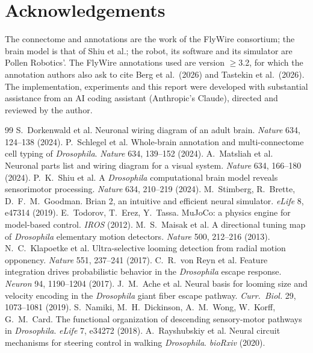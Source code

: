 \documentclass[10pt,a4paper]{article}
\begin{document}
\section*{Acknowledgements}

The connectome and annotations are the work of the FlyWire consortium; the brain model is that of Shiu et
al.; the robot, its software and its simulator are Pollen Robotics'. The FlyWire annotations used are
version $\geq$3.2, for which the annotation authors also ask to cite Berg et al.\ (2026) and Tastekin et
al.\ (2026). The implementation, experiments and this report were developed with substantial assistance
from an AI coding assistant (Anthropic's Claude), directed and reviewed by the author.

\begin{thebibliography}{99}\small
{} S.~Dorkenwald et al. Neuronal wiring diagram of an adult brain. \emph{Nature} 634, 124--138 (2024).
 P.~Schlegel et al. Whole-brain annotation and multi-connectome cell typing of \emph{Drosophila}. \emph{Nature} 634, 139--152 (2024).
 A.~Matsliah et al. Neuronal parts list and wiring diagram for a visual system. \emph{Nature} 634, 166--180 (2024).
 P.~K.~Shiu et al. A \emph{Drosophila} computational brain model reveals sensorimotor processing. \emph{Nature} 634, 210--219 (2024).
 M.~Stimberg, R.~Brette, D.~F.~M.~Goodman. Brian 2, an intuitive and efficient neural simulator. \emph{eLife} 8, e47314 (2019).
 E.~Todorov, T.~Erez, Y.~Tassa. MuJoCo: a physics engine for model-based control. \emph{IROS} (2012).
 M.~S.~Maisak et al. A directional tuning map of \emph{Drosophila} elementary motion detectors. \emph{Nature} 500, 212--216 (2013).
 N.~C.~Klapoetke et al. Ultra-selective looming detection from radial motion opponency. \emph{Nature} 551, 237--241 (2017).
 C.~R.~von Reyn et al. Feature integration drives probabilistic behavior in the \emph{Drosophila} escape response. \emph{Neuron} 94, 1190--1204 (2017).
 J.~M.~Ache et al. Neural basis for looming size and velocity encoding in the \emph{Drosophila} giant fiber escape pathway. \emph{Curr.\ Biol.} 29, 1073--1081 (2019).
 S.~Namiki, M.~H.~Dickinson, A.~M.~Wong, W.~Korff, G.~M.~Card. The functional organization of descending sensory-motor pathways in \emph{Drosophila}. \emph{eLife} 7, e34272 (2018).
 A.~Rayshubskiy et al. Neural circuit mechanisms for steering control in walking \emph{Drosophila}. \emph{bioRxiv} (2020).

\end{thebibliography}
\end{document}
